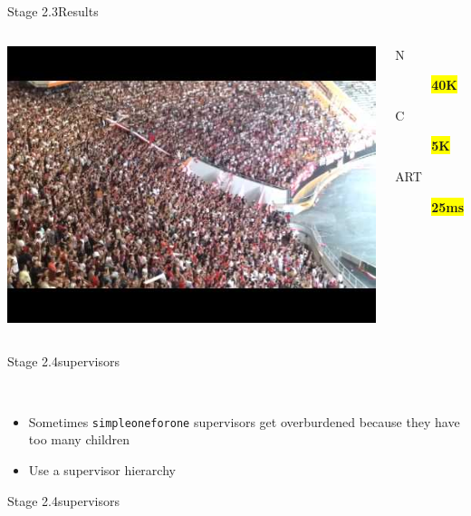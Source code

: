 \documentclass[utf8,hyperref={colorlinks=true}]{beamer}
\begin{document}
\begin{frame}{Stage 2.3}{Results}
	\begin{columns}
			\includegraphics[top=-1,width=\textwidth]{img/results-3-3.jpg}
			\begin{description}
				\item[N] \textbf{\colorbox{yellow}{\Large 40K}}
				\item[C] \textbf{\colorbox{yellow}{\Large 5K}}
				\item[ART] \textbf{\colorbox{yellow}{\Large 25ms}}
			\end{description}
	\end{columns}
\end{frame}
\begin{frame}{Stage 2.4}{supervisors}
	\begin{description}
		\item<+->[Simple One for One Supervisors]\ \\
			\begin{itemize}
				\item Sometimes \texttt{simple\textunderscore one\textunderscore for\textunderscore one} supervisors get \alert{overburdened} because they have too many children
				\item Use a supervisor hierarchy
			\end{itemize}
	\end{description}
\end{frame}
\begin{frame}{Stage 2.4}{supervisors}
\end{frame}
\end{document}
